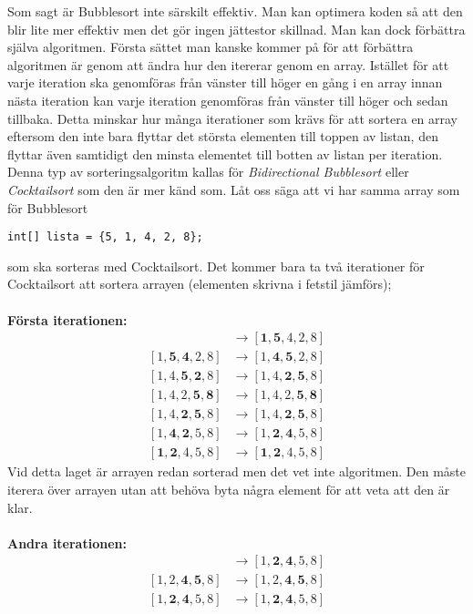 \documentclass[a4, oneside]{report}
\begin{document}
Som sagt är Bubblesort inte särskilt effektiv. Man kan optimera koden så att den blir lite mer effektiv men det gör ingen jättestor skillnad. Man kan dock förbättra själva algoritmen. Första sättet man kanske kommer på för att förbättra algoritmen är genom att ändra hur den itererar genom en array. Istället för att varje iteration ska genomföras från vänster till höger en gång i en array innan nästa iteration kan varje iteration genomföras från vänster till höger och sedan tillbaka. Detta minskar hur många iterationer som krävs för att sortera en array eftersom den inte bara flyttar det största elementen till toppen av listan, den flyttar även samtidigt den minsta elementet till botten av listan per iteration. Denna typ av sorteringsalgoritm kallas för \textit{Bidirectional Bubblesort} eller \textit{Cocktailsort} som den är mer känd som. Låt oss säga att vi har samma array som för Bubblesort
\begin{lstlisting}[style=mystyle, numbers=none]
 int[] lista = {5, 1, 4, 2, 8};
\end{lstlisting}
som ska sorteras med Cocktailsort. Det kommer bara ta två iterationer för Cocktailsort att sortera arrayen (elementen  skrivna  i  fetstil jämförs);\\\\
\textbf{Första iterationen:}
\begin{align*}
    [\textbf{5}, \textbf{1}, 4, 2, 8] &\rightarrow [\textbf{1}, \textbf{5}, 4, 2, 8]\\
    [1, \textbf{5}, \textbf{4}, 2, 8] &\rightarrow [1, \textbf{4}, \textbf{5}, 2, 8]\\
    [1, 4, \textbf{5}, \textbf{2}, 8] &\rightarrow [1, 4, \textbf{2}, \textbf{5}, 8]\\
    [1, 4, 2, \textbf{5}, \textbf{8}] &\rightarrow [1, 4, 2, \textbf{5}, \textbf{8}]\\
    [1, 4, \textbf{2}, \textbf{5}, 8] &\rightarrow [1, 4, \textbf{2}, \textbf{5}, 8]\\
    [1, \textbf{4}, \textbf{2}, 5, 8] &\rightarrow [1, \textbf{2}, \textbf{4}, 5, 8]\\
    [\textbf{1}, \textbf{2}, 4, 5, 8] &\rightarrow [\textbf{1}, \textbf{2}, 4, 5, 8]
\end{align*}
Vid  detta  laget är  arrayen  redan  sorterad  men  det  vet  inte  algoritmen.  Den måste iterera över arrayen utan att behöva byta några element för att veta att den är klar.\\\\
\textbf{Andra iterationen:}
\begin{align*}
    [1, \textbf{2}, \textbf{4}, 5, 8] &\rightarrow [1, \textbf{2}, \textbf{4}, 5, 8]\\
    [1, 2, \textbf{4}, \textbf{5}, 8] &\rightarrow [1, 2, \textbf{4}, \textbf{5}, 8]\\
    [1, \textbf{2}, \textbf{4}, 5, 8] &\rightarrow [1, \textbf{2}, \textbf{4}, 5, 8]
\end{align*}
\end{document}
